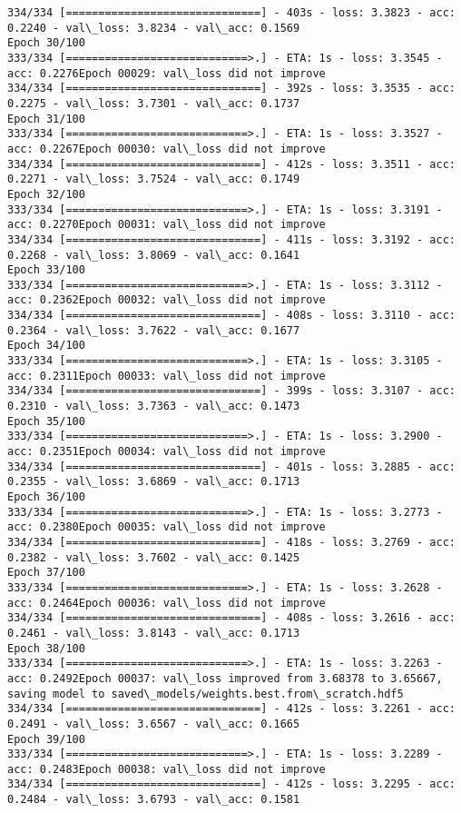 \documentclass[11pt]{article}
\begin{document}
\begin{Verbatim}[commandchars=\\\{\}]
334/334 [==============================] - 403s - loss: 3.3823 - acc: 0.2240 - val\_loss: 3.8234 - val\_acc: 0.1569
Epoch 30/100
333/334 [============================>.] - ETA: 1s - loss: 3.3545 - acc: 0.2276Epoch 00029: val\_loss did not improve
334/334 [==============================] - 392s - loss: 3.3535 - acc: 0.2275 - val\_loss: 3.7301 - val\_acc: 0.1737
Epoch 31/100
333/334 [============================>.] - ETA: 1s - loss: 3.3527 - acc: 0.2267Epoch 00030: val\_loss did not improve
334/334 [==============================] - 412s - loss: 3.3511 - acc: 0.2271 - val\_loss: 3.7524 - val\_acc: 0.1749
Epoch 32/100
333/334 [============================>.] - ETA: 1s - loss: 3.3191 - acc: 0.2270Epoch 00031: val\_loss did not improve
334/334 [==============================] - 411s - loss: 3.3192 - acc: 0.2268 - val\_loss: 3.8069 - val\_acc: 0.1641
Epoch 33/100
333/334 [============================>.] - ETA: 1s - loss: 3.3112 - acc: 0.2362Epoch 00032: val\_loss did not improve
334/334 [==============================] - 408s - loss: 3.3110 - acc: 0.2364 - val\_loss: 3.7622 - val\_acc: 0.1677
Epoch 34/100
333/334 [============================>.] - ETA: 1s - loss: 3.3105 - acc: 0.2311Epoch 00033: val\_loss did not improve
334/334 [==============================] - 399s - loss: 3.3107 - acc: 0.2310 - val\_loss: 3.7363 - val\_acc: 0.1473
Epoch 35/100
333/334 [============================>.] - ETA: 1s - loss: 3.2900 - acc: 0.2351Epoch 00034: val\_loss did not improve
334/334 [==============================] - 401s - loss: 3.2885 - acc: 0.2355 - val\_loss: 3.6869 - val\_acc: 0.1713
Epoch 36/100
333/334 [============================>.] - ETA: 1s - loss: 3.2773 - acc: 0.2380Epoch 00035: val\_loss did not improve
334/334 [==============================] - 418s - loss: 3.2769 - acc: 0.2382 - val\_loss: 3.7602 - val\_acc: 0.1425
Epoch 37/100
333/334 [============================>.] - ETA: 1s - loss: 3.2628 - acc: 0.2464Epoch 00036: val\_loss did not improve
334/334 [==============================] - 408s - loss: 3.2616 - acc: 0.2461 - val\_loss: 3.8143 - val\_acc: 0.1713
Epoch 38/100
333/334 [============================>.] - ETA: 1s - loss: 3.2263 - acc: 0.2492Epoch 00037: val\_loss improved from 3.68378 to 3.65667, saving model to saved\_models/weights.best.from\_scratch.hdf5
334/334 [==============================] - 412s - loss: 3.2261 - acc: 0.2491 - val\_loss: 3.6567 - val\_acc: 0.1665
Epoch 39/100
333/334 [============================>.] - ETA: 1s - loss: 3.2289 - acc: 0.2483Epoch 00038: val\_loss did not improve
334/334 [==============================] - 412s - loss: 3.2295 - acc: 0.2484 - val\_loss: 3.6793 - val\_acc: 0.1581

\end{Verbatim}
\end{document}
